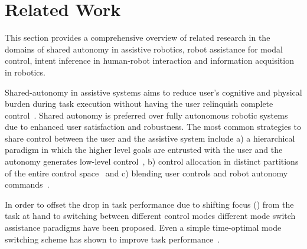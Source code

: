 %


\section{Related Work}\label{sec:related-work}
This section provides a comprehensive overview of related research in the domains of shared autonomy in assistive robotics, robot assistance for modal control, intent inference in human-robot interaction and information acquisition in robotics. 

Shared-autonomy in assistive systems aims to reduce user's cognitive and physical burden during task execution without having the user relinquish complete control~\cite{philips2007adaptive,demeester2008user, gopinath2017human, muelling2017autonomy}. Shared autonomy is preferred over fully autonomous robotic systems due to enhanced user satisfaction and robustness. The most common strategies to share control between the user and the assistive system include a) a hierarchical paradigm in which the higher level goals are entrusted with the user and the autonomy generates low-level control~\cite{tsui2011want, kim2010relationship, kim2012autonomy}, b) control allocation in distinct partitions of the entire control space~\cite{driessen2005collaborative} and c) blending user controls and robot autonomy commands~\cite{downey2016blending, storms2014blending, muelling2017autonomy}. 

In order to offset the drop in task performance due to shifting focus () from the task at hand to switching between different control modes different mode switch assistance paradigms have been proposed. Even a simple time-optimal mode switching scheme has shown to improve task performance~\cite{herlant2016assistive}. 

